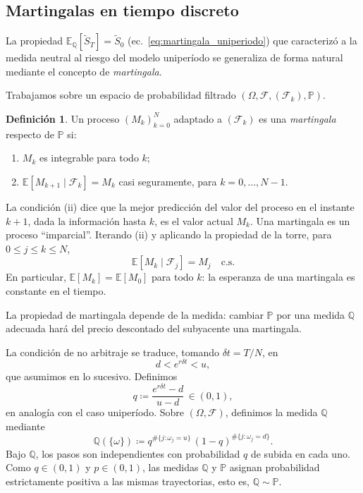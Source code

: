 \documentclass[11pt,a4paper,oneside]{report}
\theoremstyle{plain}
\theoremstyle{definition}
\newtheorem{definicion}[teorema]{Definición}
\theoremstyle{remark}
\newcommand{\E}{\mathbb{E}}
\newcommand{\PP}{\mathbb{P}}
\newcommand{\Q}{\mathbb{Q}}
\newcommand{\F}{\mathcal{F}}
\newcommand{\1}{\mathbf{1}}
\newcommand{\eqdef}{\coloneqq}
\begin{document}
\subsection{Martingalas en tiempo discreto}
\label{subsec:martingalas_discretas}

La propiedad $\E_\Q[\widetilde S_T] = \widetilde S_0$
(ec.~\eqref{eq:martingala_uniperiodo}) que caracterizó a la medida
neutral al riesgo del modelo uniperíodo se generaliza de forma
natural mediante el concepto de \emph{martingala}.

Trabajamos sobre
un espacio de probabilidad filtrado $(\Omega, \F, (\F_k), \PP)$.

\begin{definicion}
\label{def:martingala}
Un proceso $(M_k)_{k=0}^{N}$ adaptado a $(\F_k)$ es una
\emph{martingala} respecto de $\PP$ si:
\begin{enumerate}[label=\textnormal{(\roman*)}]
  \item $M_k$ es integrable para todo $k$;
  \item $\E[M_{k+1} \mid \F_k] = M_k$ casi seguramente, para $k = 0,
        \ldots, N-1$.
\end{enumerate}
\end{definicion}

La condición (ii) dice que la mejor predicción del valor del
proceso en el instante $k+1$, dada la información hasta $k$, es el
valor actual $M_k$. Una martingala es un proceso ``imparcial''.
Iterando (ii) y aplicando la propiedad de la torre, para $0 \leq j \leq
k \leq N$,
\begin{equation}\label{eq:martingala_iterada}
  \E[M_k \mid \F_j] = M_j \quad \text{c.s.}
\end{equation}
En particular, $\E[M_k] = \E[M_0]$ para todo $k$: la esperanza de una
martingala es constante en el tiempo.

\medskip

La propiedad de martingala depende de la medida: cambiar $\PP$ por
una medida $\Q$ adecuada hará del precio descontado del subyacente
una martingala.

La
condición de no arbitraje se traduce, tomando $\delta t = T/N$, en
\begin{equation}\label{eq:cond_noarb_multi}
  d < e^{r \delta t} < u,
\end{equation}
que asumimos en lo sucesivo. Definimos
\begin{equation}\label{eq:def_q_multi}
  q \eqdef \frac{e^{r \delta t} - d}{u - d}\, \in (0, 1),
\end{equation}
en analogía con el caso uniperíodo. Sobre $(\Omega, \F)$, definimos la
medida $\Q$ mediante
\begin{equation}\label{eq:def_Q_multi}
  \Q(\{\omega\}) \eqdef q^{\#\{j: \omega_j = u\}}\,
                       (1-q)^{\#\{j: \omega_j = d\}}.
\end{equation}
Bajo $\Q$, los pasos son independientes con probabilidad $q$ de subida
en cada uno. Como $q \in (0, 1)$ y $p \in (0, 1)$, las medidas $\Q$ y
$\PP$ asignan probabilidad estrictamente positiva a las mismas
trayectorias, esto es, $\Q \sim \PP$.
\end{document}
